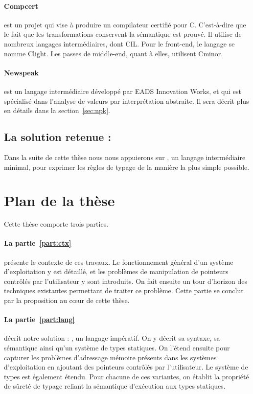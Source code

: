 \paragraph{Compcert} est un projet qui vise à produire un compilateur certifié
pour C. C'est-à-dire que le fait que les transformations conservent la
sémantique est prouvé. Il utilise de nombreux langages intermédiaires, dont CIL.
Pour le front-end, le langage se nomme Clight\cite{cfront}. Les passes de
middle-end, quant à elles, utilisent Cminor\cite{cminorSL}.

\paragraph{Newspeak}\cite{newspeak} est un langage intermédiaire développé par
EADS Innovation Works, et qui est spécialisé dans l'analyse de valeurs par
interprétation abstraite. Il sera décrit plus en détails dans la
section~\ref{sec:npk}.

\subsection*{La solution retenue : \langname}

Dans la suite de cette thèse nous nous appuierons sur \langname, un langage
intermédiaire minimal, pour exprimer les règles de typage de la manière la plus
simple possible.

\section{Plan de la thèse}

Cette thèse comporte trois parties.

\paragraph{La partie~\ref{part:ctx}} présente le contexte de ces travaux. Le
fonctionnement général d'un système d'exploitation y est détaillé, et les
problèmes de manipulation de pointeurs contrôlés par l'utilisateur y sont
introduits. On fait ensuite un tour d'horizon des techniques existantes
permettant de traiter ce problème. Cette partie se conclut par la proposition au
cœur de cette thèse.

\paragraph{La partie~\ref{part:lang}} décrit notre solution : \langname, un
langage impératif. On y décrit sa syntaxe, sa sémantique ainsi qu'un système de
types statiques. On l'étend ensuite pour capturer les problèmes d'adressage
mémoire présents dans les systèmes d'exploitation en ajoutant des pointeurs
contrôlés par l'utilisateur. Le système de types est également étendu. Pour
chacune de ces variantes, on établit la propriété de sûreté de typage reliant la
sémantique d'exécution aux types statiques.

